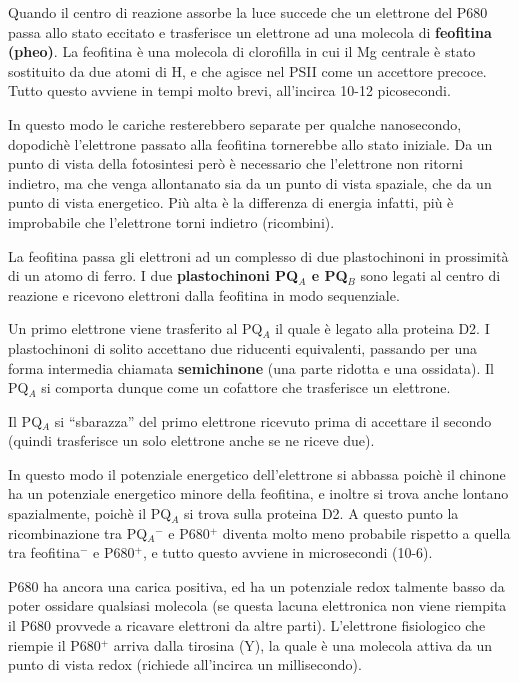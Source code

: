 \documentclass[]{article}
\begin{document}
Quando il centro di reazione assorbe la luce succede che un elettrone
del P680 passa allo stato eccitato e trasferisce un elettrone ad una
molecola di \textbf{feofitina (pheo)}. La feofitina è una molecola di
clorofilla in cui il Mg centrale è stato sostituito da due atomi di H, e
che agisce nel PSII come un accettore precoce. Tutto questo avviene in
tempi molto brevi, all'incirca 10-12 picosecondi.

In questo modo le cariche resterebbero separate per qualche nanosecondo,
dopodichè l'elettrone passato alla feofitina tornerebbe allo stato
iniziale. Da un punto di vista della fotosintesi però è necessario che
l'elettrone non ritorni indietro, ma che venga allontanato sia da un
punto di vista spaziale, che da un punto di vista energetico. Più
alta è la differenza di energia infatti, più è improbabile che
l'elettrone torni indietro (ricombini).

La feofitina passa gli elettroni ad un complesso di due plastochinoni in
prossimità di un atomo di ferro. I due \textbf{plastochinoni PQ$_A$ e
PQ$_B$} sono legati al centro di reazione e ricevono elettroni dalla
feofitina in modo sequenziale.

Un primo elettrone viene trasferito al PQ$_A$ il quale è legato alla
proteina D2. I plastochinoni di solito accettano due riducenti
equivalenti, passando per una forma intermedia chiamata
\textbf{semichinone} (una parte ridotta e una ossidata). Il PQ$_A$ si
comporta dunque come un cofattore che trasferisce un elettrone.

Il PQ$_A$ si ``sbarazza'' del primo elettrone ricevuto prima
di accettare il secondo (quindi trasferisce un solo elettrone anche se
ne riceve due).

In questo modo il potenziale energetico dell'elettrone si abbassa poichè
il chinone ha un potenziale energetico minore della feofitina, e inoltre
si trova anche lontano spazialmente, poichè il PQ$_A$ si trova sulla
proteina D2. A questo punto la ricombinazione tra PQ$_A$$^-$ e P680$^+$
diventa molto meno probabile rispetto a quella tra feofitina$^-$ e
P680$^+$, e tutto questo avviene in microsecondi (10-6).

P680 ha ancora una carica positiva, ed ha un potenziale redox talmente
basso da poter ossidare qualsiasi molecola (se questa lacuna elettronica
non viene riempita il P680 provvede a ricavare elettroni da altre
parti). L'elettrone fisiologico che riempie il P680$^+$ arriva dalla
tirosina (Y), la quale è una molecola attiva da un punto di vista redox
(richiede all'incirca un millisecondo).
\end{document}
